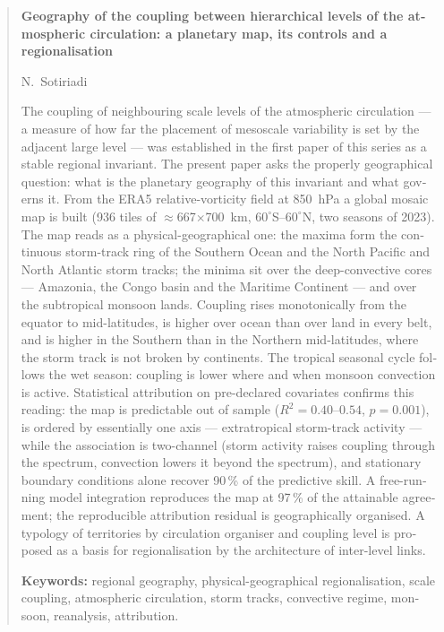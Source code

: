 \documentclass[11pt,a4paper]{article}
\newenvironment{englishblock}{\begin{otherlanguage}{english}}{\end{otherlanguage}}
\newenvironment{englishblock}{\begin{english}}{\end{english}}
\begin{document}
\begin{englishblock}
\begin{abstract}
\noindent\textbf{Geography of the coupling between hierarchical levels of the atmospheric
circulation: a planetary map, its controls and a regionalisation}

\smallskip\noindent N.~Sotiriadi

\smallskip\noindent The coupling of neighbouring scale levels of the atmospheric circulation
--- a measure of how far the placement of mesoscale variability is set by the adjacent large
level --- was established in the first paper of this series as a stable regional invariant.
The present paper asks the properly geographical question: what is the planetary geography of
this invariant and what governs it. From the ERA5 relative-vorticity field at 850~hPa a global
mosaic map is built (936 tiles of $\approx$667$\times$700~km, $60^\circ$S--$60^\circ$N, two
seasons of 2023). The map reads as a physical-geographical one: the maxima form the continuous
storm-track ring of the Southern Ocean and the North Pacific and North Atlantic storm tracks;
the minima sit over the deep-convective cores --- Amazonia, the Congo basin and the Maritime
Continent --- and over the subtropical monsoon lands. Coupling rises monotonically from the
equator to mid-latitudes, is higher over ocean than over land in every belt, and is higher in
the Southern than in the Northern mid-latitudes, where the storm track is not broken by
continents. The tropical seasonal cycle follows the wet season: coupling is lower where and
when monsoon convection is active. Statistical attribution on pre-declared covariates confirms
this reading: the map is predictable out of sample ($R^2=0.40$--$0.54$, $p=0.001$), is ordered
by essentially one axis --- extratropical storm-track activity --- while the association is
two-channel (storm activity raises coupling through the spectrum, convection lowers it beyond
the spectrum), and stationary boundary conditions alone recover 90\,\% of the predictive skill.
A free-running model integration reproduces the map at 97\,\% of the attainable agreement; the
reproducible attribution residual is geographically organised. A typology of territories by
circulation organiser and coupling level is proposed as a basis for regionalisation by the
architecture of inter-level links.

\smallskip
\noindent\textbf{Keywords:} regional geography, physical-geographical regionalisation, scale
coupling, atmospheric circulation, storm tracks, convective regime, monsoon, reanalysis,
attribution.
\end{abstract}
\end{englishblock}
\end{document}

